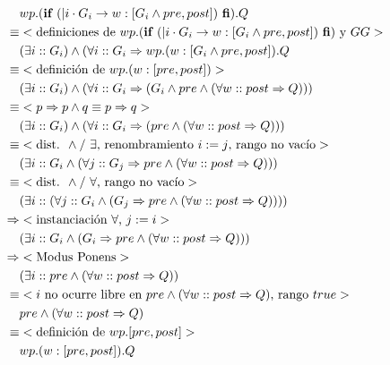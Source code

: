 \documentclass{article}
\begin{document}
\section{}

\begin{align*}
 & wp.(\text{{\bf if }} (| i \cdot G_i \rightarrow w : [G_i \wedge pre, post]) \text{ {\bf fi}}).Q \\
 \equiv & <\text{definiciones de } wp.(\text{{\bf if }} (| i \cdot G_i \rightarrow w : [G_i \wedge pre, post]) \text{ {\bf fi}}) \text{ y } GG> \\
 & (\exists i :: G_i) \wedge (\forall i :: G_i \Rightarrow wp.(w : [G_i \wedge pre, post]).Q \\
 \equiv & <\text{definición de } wp.(w : [pre,post])> \\
 & (\exists i :: G_i) \wedge (\forall i :: G_i \Rightarrow (G_i \wedge pre \wedge (\forall w :: post \Rightarrow Q))) \\
 \equiv & <p \Rightarrow p \wedge q \equiv p \Rightarrow q> \\
 & (\exists i :: G_i) \wedge (\forall i :: G_i \Rightarrow (pre \wedge (\forall w :: post \Rightarrow Q))) \\
 \equiv & <\text{dist. } \wedge \text{/ } \exists \text{, renombramiento } i := j \text{, rango no vacío}> \\
 & (\exists i :: G_i \wedge (\forall j :: G_j \Rightarrow pre \wedge (\forall w :: post \Rightarrow Q))) \\
 \equiv & <\text{dist. } \wedge \text{/ } \forall \text{, rango no vacío}> \\
 & (\exists i :: (\forall j :: G_i \wedge (G_j \Rightarrow pre \wedge (\forall w :: post \Rightarrow Q)))) \\
 \Rightarrow & <\text{instanciación } \forall \text{, } j := i> \\
 & (\exists i :: G_i \wedge (G_i \Rightarrow pre \wedge (\forall w :: post \Rightarrow Q))) \\
 \Rightarrow & <\text{Modus Ponens}> \\
 & (\exists i :: pre \wedge (\forall w :: post \Rightarrow Q)) \\
 \equiv & <i \text{ no ocurre libre en } pre \wedge (\forall w :: post \Rightarrow Q) \text{, rango } true> \\
 & pre \wedge (\forall w :: post \Rightarrow Q) \\
 \equiv & <\text{definición de } wp.[pre,post]> \\
 & wp.(w : [pre,post]).Q
\end{align*}
\end{document}
